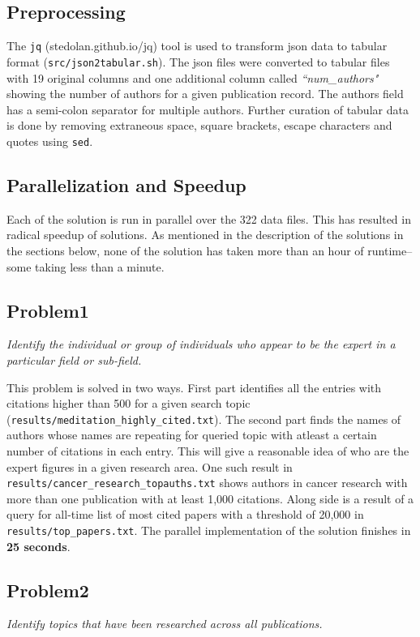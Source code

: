 \documentclass{article}
\begin{document}
\subsection*{Preprocessing}
The \texttt{jq} (stedolan.github.io/jq) tool is used to transform json data to
tabular format (\texttt{src/json2tabular.sh}).  The json files were converted
to tabular files with 19 original columns and one additional column called
\textit{``num\_authors"} showing the number of authors for a given publication
record. The authors field has a semi-colon separator for multiple authors.
Further curation of tabular data is done by removing extraneous space, square
brackets, escape characters and quotes using \texttt{sed}.

\subsection*{Parallelization and Speedup}
Each of the solution is run in parallel over the 322 data files. This has
resulted in radical speedup of solutions. As mentioned in the
description of the solutions in the sections below, none of the solution has
taken more than an hour of runtime--some taking less than a minute.

\subsection*{Problem1}
\textit{Identify the individual or group of individuals who appear to be the expert in a particular field or sub-field.}

This problem is solved in two ways. First part identifies all the entries with
citations higher than 500 for a given search topic
(\texttt{results/meditation\_highly\_cited.txt}). The second part finds the
names of authors whose names are repeating for queried topic with atleast a
certain number of citations in each entry. This will give a reasonable idea of
who are the expert figures in a given research area. One such result in
\texttt{results/cancer\_research\_topauths.txt} shows authors in cancer
research with more than one publication with at least 1,000 citations.  Along
side is a result of a query for all-time list of most cited papers with a
threshold of 20,000 in \texttt{results/top\_papers.txt}. The parallel
implementation of the solution finishes in \textbf{25 seconds}.

\subsection*{Problem2}
\textit{Identify topics that have been researched across all publications.}
\end{document}
